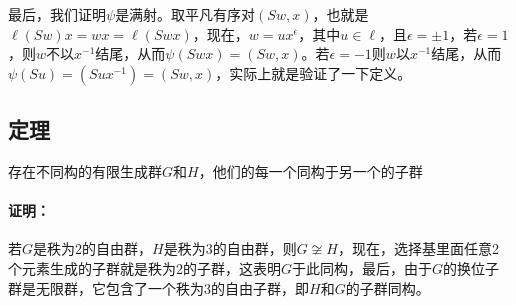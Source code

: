 \documentclass[UTF8]{article}
\begin{document}
最后，我们证明$\psi$是满射。取平凡有序对$(Sw,x)$，也就是$\ell(Sw)x = wx = \ell(Swx)$，现在，$w = ux^\epsilon$，其中$u\in \ell$，且$\epsilon = \pm 1$，若$\epsilon = 1$，则$w$不以$x^{-1}$结尾，从而$\psi(Swx) = (Sw,x)$。若$\epsilon = -1$则$w$以$x^{-1}$结尾，从而$\psi(Su) = (Sux^{-1}) = (Sw,x)$，实际上就是验证了一下定义。

\subsection{定理}

存在不同构的有限生成群$G$和$H$，他们的每一个同构于另一个的子群

\paragraph{证明：}若$G$是秩为2的自由群，$H$是秩为3的自由群，则$G\not\cong H$，现在，选择基里面任意2个元素生成的子群就是秩为2的子群，这表明$G$于此同构，最后，由于$G$的换位子群是无限群，它包含了一个秩为3的自由子群，即$H$和$G$的子群同构。
\end{document}
